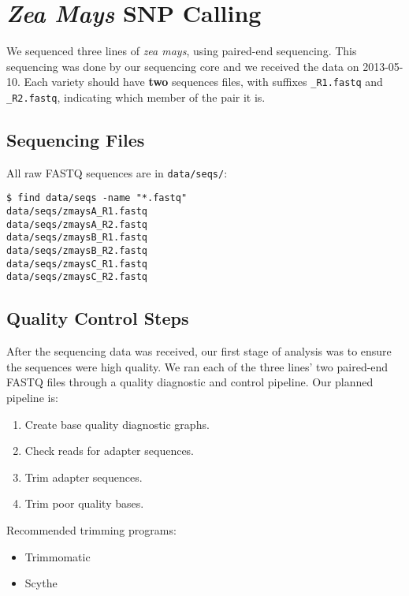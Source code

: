 \section{\texorpdfstring{\emph{Zea Mays} SNP
Calling}{Zea Mays SNP Calling}}\label{zea-mays-snp-calling}

We sequenced three lines of \emph{zea mays}, using paired-end
sequencing. This sequencing was done by our sequencing core and we
received the data on 2013-05-10. Each variety should have \textbf{two}
sequences files, with suffixes \texttt{\_R1.fastq} and
\texttt{\_R2.fastq}, indicating which member of the pair it is.

\subsection{Sequencing Files}\label{sequencing-files}

All raw FASTQ sequences are in \texttt{data/seqs/}:

\begin{verbatim}
$ find data/seqs -name "*.fastq"
data/seqs/zmaysA_R1.fastq
data/seqs/zmaysA_R2.fastq
data/seqs/zmaysB_R1.fastq
data/seqs/zmaysB_R2.fastq
data/seqs/zmaysC_R1.fastq
data/seqs/zmaysC_R2.fastq
\end{verbatim}

\subsection{Quality Control Steps}\label{quality-control-steps}

After the sequencing data was received, our first stage of analysis was
to ensure the sequences were high quality. We ran each of the three
lines' two paired-end FASTQ files through a quality diagnostic and
control pipeline. Our planned pipeline is:

\begin{enumerate}
\def\labelenumi{\arabic{enumi}.}
\tightlist
\item
  Create base quality diagnostic graphs.
\item
  Check reads for adapter sequences.
\item
  Trim adapter sequences.
\item
  Trim poor quality bases.
\end{enumerate}

Recommended trimming programs:

\begin{itemize}
\tightlist
\item
  Trimmomatic
\item
  Scythe
\end{itemize}
